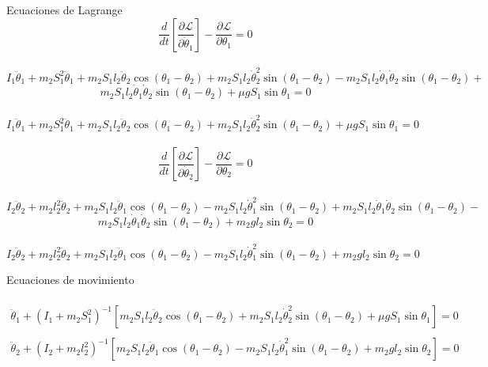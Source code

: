 \documentclass[10pt,a4papper]{article}
\begin{document}
\newpage
Ecuaciones de Lagrange
\[\frac{d}{dt}\left[\frac{\partial\mathcal{L}}{\partial\dot \theta_1}\right]-\frac{\partial\mathcal{L}}{\partial \theta_1}=0\]\\

\[I_1\ddot\theta_1+m_2S_1^2\ddot\theta_1+m_2S_1l_2\ddot\theta_2\cos(\theta_1-\theta_2)+m_2S_1l_2\dot\theta_2^2\sin(\theta_1-\theta_2)-m_2S_1l_2\dot\theta_1\dot\theta_2\sin(\theta_1-\theta_2)+\]
\[m_2S_1l_2\dot\theta_1\dot\theta_2\sin(\theta_1-\theta_2)+\mu gS_1\sin\theta_1=0\]\\
\[I_1\ddot\theta_1+m_2S_1^2\ddot\theta_1+m_2S_1l_2\ddot\theta_2\cos(\theta_1-\theta_2)+m_2S_1l_2\dot\theta_2^2\sin(\theta_1-\theta_2)+\mu gS_1\sin\theta_1=0\]\\

\[\frac{d}{dt}\left[\frac{\partial\mathcal{L}}{\partial\dot \theta_2}\right]-\frac{\partial\mathcal{L}}{\partial \theta_2}=0\]\\

\[I_2\ddot\theta_2+m_2l_2^2\ddot\theta_2+m_2S_1l_2\ddot\theta_1\cos(\theta_1-\theta_2)-m_2S_1l_2\dot\theta_1^2\sin(\theta_1-\theta_2)+m_2S_1l_2\dot\theta_1\dot\theta_2\sin(\theta_1-\theta_2)-\]
\[m_2S_1l_2\dot\theta_1\dot\theta_2\sin(\theta_1-\theta_2)+m_2gl_2\sin\theta_2=0\]\\
\[I_2\ddot\theta_2+m_2l_2^2\ddot\theta_2+m_2S_1l_2\ddot\theta_1\cos(\theta_1-\theta_2)-m_2S_1l_2\dot\theta_1^2\sin(\theta_1-\theta_2)+m_2gl_2\sin\theta_2=0\]

\newpage
Ecuaciones de movimiento\\\\
\[\boxed{
  \begin{array}{rcl}
    \ddot\theta_1+(I_1+m_2S_1^2)^{-1}\left[m_2S_1l_2\ddot\theta_2\cos(\theta_1-\theta_2)+m_2S_1l_2\dot\theta_2^2\sin(\theta_1-\theta_2)+\mu gS_1\sin\theta_1\right]=0\\\\
    \ddot\theta_2+(I_2+m_2l_2^2)^{-1}\left[m_2S_1l_2\ddot\theta_1\cos(\theta_1-\theta_2)-m_2S_1l_2\dot\theta_1^2\sin(\theta_1-\theta_2)+m_2gl_2\sin\theta_2\right]=0
  \end{array}
}\]
\end{document}
